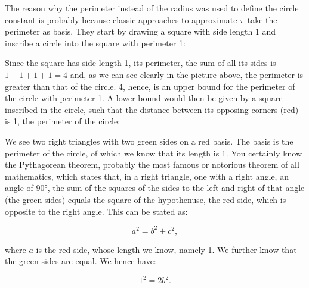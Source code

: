 \documentclass[tikz]{scrreprt}
\begin{document}
The reason why the perimeter 
instead of the radius was used
to define the circle constant is probably
because classic approaches to approximate $\pi$
take the perimeter as basis.
They start by drawing a square with side length 1
and inscribe a circle into the square with 
perimeter 1:

\begin{center}
\end{center}

Since the square has side length 1,
its perimeter, the sum of all its sides is
$1+1+1+1 = 4$ and, as we can see clearly
in the picture above, the perimeter
is greater than that of the circle.
4, hence, is an upper bound for the perimeter
of the circle with perimeter 1.
A lower bound would then be given
by a square inscribed in the circle,
such that the distance between 
its opposing corners (red) is 1, the perimeter
of the circle:

\begin{center}
\end{center}

We see two right triangles with two green sides 
on a red basis. The basis is the perimeter
of the circle, of which we know that its length is 1.
You certainly know the Pythagorean theorem,
probably the most famous or notorious theorem of all mathematics,
which states that, in a right triangle,
one with a right angle, an angle of 90°, the sum of the squares
of the sides to the left and right of that angle (the green sides)
equals the square of the hypothenuse, the red side,
which is opposite to the right angle.
This can be stated as:

\begin{equation}
a^2 = b^2 + c^2,
\end{equation}

where $a$ is the red side, whose length we know,
namely 1. We further know that the green sides
are equal. We hence have:

\begin{equation}
1^2 = 2b^2.
\end{equation}
\end{document}
